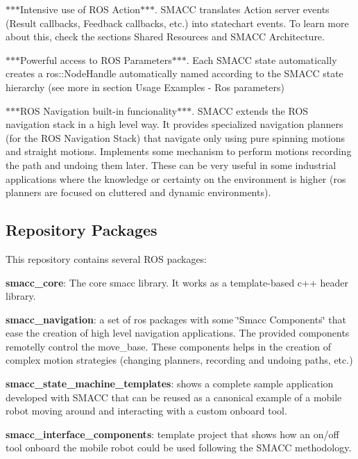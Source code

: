 \begin{DoxyItemize}
\item $\ast$$\ast$$\ast$\+Intensive use of R\+OS Action$\ast$$\ast$$\ast$. S\+M\+A\+CC translates Action server events (Result callbacks, Feedback callbacks, etc.) into statechart events. To learn more about this, check the sections Shared Resources and S\+M\+A\+CC Architecture.
\item $\ast$$\ast$$\ast$\+Powerful access to R\+OS Parameters$\ast$$\ast$$\ast$. Each S\+M\+A\+CC state automatically creates a ros\+::\+Node\+Handle automatically named according to the S\+M\+A\+CC state hierarchy (see more in section Usage Examples -\/ Ros parameters)
\item $\ast$$\ast$$\ast$\+R\+OS Navigation built-\/in funcionality$\ast$$\ast$$\ast$. S\+M\+A\+CC extends the R\+OS navigation stack in a high level way. It provides specialized navigation planners (for the R\+OS Navigation Stack) that navigate only using pure spinning motions and straight motions. Implements some mechanism to perform motions recording the path and undoing them later. These can be very useful in some industrial applications where the knowledge or certainty on the environment is higher (ros planners are focused on cluttered and dynamic environments).
\end{DoxyItemize}

\subsection*{Repository Packages}

This repository contains several R\+OS packages\+:


\begin{DoxyItemize}
\item {\bfseries smacc\+\_\+core}\+: The core smacc library. It works as a template-\/based c++ header library.
\item {\bfseries smacc\+\_\+navigation}\+: a set of ros packages with some \char`\"{}\+Smacc Components\char`\"{} that ease the creation of high level navigation applications. The provided components remotelly control the move\+\_\+base. These components helps in the creation of complex motion strategies (changing planners, recording and undoing paths, etc.)
\item {\bfseries smacc\+\_\+state\+\_\+machine\+\_\+templates}\+: shows a complete sample application developed with S\+M\+A\+CC that can be reused as a canonical example of a mobile robot moving around and interacting with a custom onboard tool.
\item {\bfseries smacc\+\_\+interface\+\_\+components}\+: template project that shows how an on/off tool onboard the mobile robot could be used following the S\+M\+A\+CC methodology.
\end{DoxyItemize}

